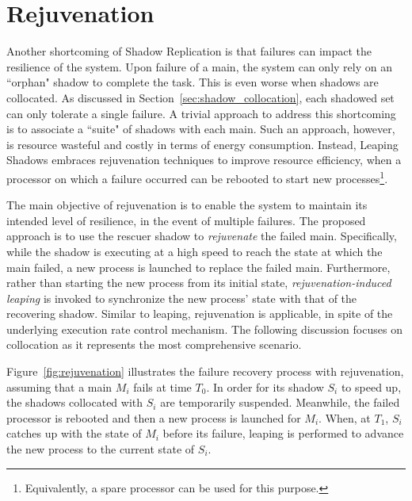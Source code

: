 \section{Rejuvenation}
\label{sec:rejuvenation}
Another shortcoming of Shadow Replication is that failures can impact the resilience of the system. 
Upon failure of a main, the system can only rely on an
``orphan" shadow to complete the task. 
This is even worse when shadows are collocated. As discussed in Section~\ref{sec:shadow_collocation}, each shadowed set can only tolerate a single failure. 
A trivial approach to
address this shortcoming is to associate a ``suite" of shadows
with each main. Such an approach, however, is resource
wasteful and costly in terms of energy consumption. Instead, Leaping Shadows embraces rejuvenation techniques to improve resource efficiency, when a processor on which a failure occurred can be rebooted to start new processes\footnote{Equivalently, a spare processor can be used for this purpose.}. %

The main objective of rejuvenation is to enable the
system to maintain its intended level of resilience, in the
event of multiple failures. The proposed approach is to use the rescuer shadow to \textit{rejuvenate} the failed main.  Specifically, while the shadow is executing at a high speed to reach the state at which the main failed, a new process is launched to replace the failed main. Furthermore, rather than starting the new process from its initial state, \textit{rejuvenation-induced leaping} is invoked to synchronize the new process' state with that of the recovering shadow. Similar to leaping, rejuvenation is applicable, in spite of the underlying execution rate control mechanism. The following discussion focuses on collocation as it represents the most comprehensive scenario. 


Figure~\ref{fig:rejuvenation} illustrates the failure recovery process with rejuvenation, assuming that a main $M_i$ fails at time $T_0$. 
In order for its shadow $S_i$ to speed up, the shadows collocated with $S_i$ are temporarily suspended. %
Meanwhile, the failed processor is rebooted and then a new process is launched for $M_i$. When, at $T_1$, $S_i$ catches up with the state of $M_i$ before its failure, leaping is performed to advance the new process to the current state of $S_i$. 

